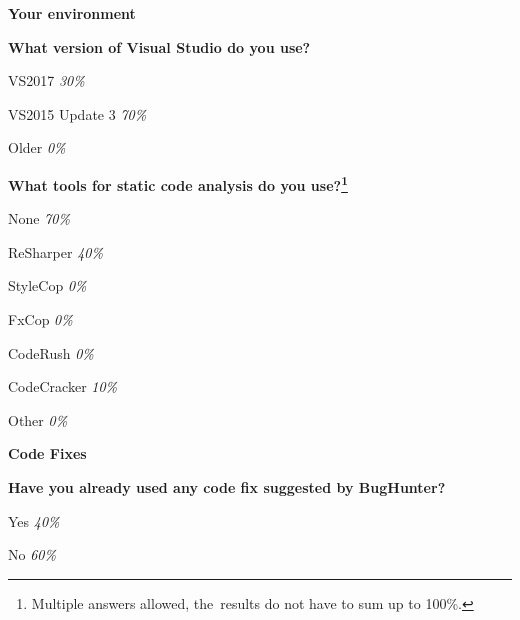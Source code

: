 \documentclass[
  digital, %
  table,   %
  lof,     %
  lot,     %
  oneside,
]{fithesis3}
\begin{document}
%
%
%
%

\begin{center}
\textbf{Your environment}
\end{center}

\smallskip\noindent
\textbf{What version of Visual Studio do you use?}
\begin{compactitem}
\item VS2017 \textit{30\%}
\item VS2015 Update 3 \textit{70\%}
\item Older \textit{0\%}
\end{compactitem}

\smallskip\noindent
\textbf{What tools for static code analysis do you use?\footnote{Multiple answers allowed, the~results do not have to sum up to 100\%.}}
\begin{compactitem}
\item None \textit{70\%}
\item ReSharper \textit{40\%}
\item StyleCop \textit{0\%}
\item FxCop \textit{0\%}
\item CodeRush \textit{0\%}
\item CodeCracker \textit{10\%}
\item Other \textit{0\%}
\end{compactitem}

\begin{center}
\textbf{Code Fixes}
\end{center}

\smallskip\noindent
\textbf{Have you already used any code fix suggested by BugHunter?}
\begin{compactitem}
\item Yes \textit{40\%}
\item No \textit{60\%}
\end{compactitem}
\end{document}
